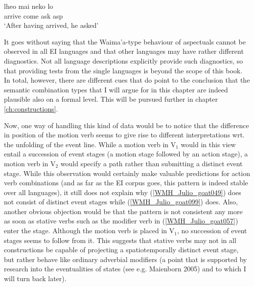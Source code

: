 \ea \label{WMH_Julio_goat067} 
\gll lheo mai neko lo \\
 arrive come ask \acs{asp} \\
\glft `After having arrived, he asked' \\
\z
\xe

It goes without saying that the Waima'a-type behaviour of aspectuals cannot be observed in all EI languages and that other languages may have rather different diagnostics. Not all language descriptions explicitly provide such diagnostics, so that providing tests from the single languages is beyond the scope of this book. In total, however, there are different cues that do point to the conclusion that the semantic combination types that I will argue for in this chapter are indeed plausible also on a formal level. This will be pursued further in chapter \ref{ch:constructions}.

Now, one way of handling this kind of data would be to notice that the difference in position of the motion verb seems to give rise to different interpretations wrt. the unfolding of the event line. While a motion verb in V$_1$ would in this view entail a succession of event stages (a motion stage followed by an action stage), a motion verb in V$_2$ would specify a path rather than submitting a distinct event stage. While this observation would certainly make valuable predictions for action verb combinations (and as far as the EI corpus goes, this pattern is indeed stable over all languages), it still does not explain why (\ref{WMH_Julio_goat049}) does not consist of distinct event stages while (\ref{WMH_Julio_goat099}) does. Also, another obvious objection would be that the pattern is not consistent any more as soon as stative verbs such as the modifier verb in (\ref{WMH_Julio_goat057}) enter the stage. Although the motion verb is placed in V$_1$, no succession of event stages seems to follow from it. This suggests that stative verbs may not in all constructions be capable of projecting a spatiotemporally distinct event stage, but rather behave like ordinary adverbial modifiers (a point that is supported by research into the eventualities of states (see e.g. Maienborn 2005) and to which I will turn back later).

